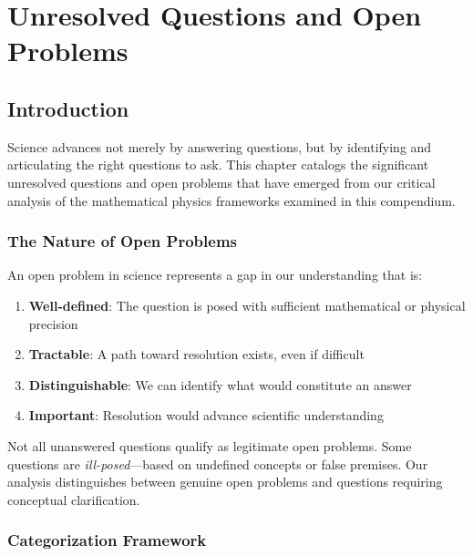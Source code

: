 
\chapter{Unresolved Questions and Open Problems}
\label{ch:unresolved}

\section{Introduction}

Science advances not merely by answering questions, but by identifying and articulating the right questions to ask. This chapter catalogs the significant unresolved questions and open problems that have emerged from our critical analysis of the mathematical physics frameworks examined in this compendium.

\subsection{The Nature of Open Problems}

An open problem in science represents a gap in our understanding that is:
\begin{enumerate}
    \item \textbf{Well-defined}: The question is posed with sufficient mathematical or physical precision
    \item \textbf{Tractable}: A path toward resolution exists, even if difficult
    \item \textbf{Distinguishable}: We can identify what would constitute an answer
    \item \textbf{Important}: Resolution would advance scientific understanding
\end{enumerate}

Not all unanswered questions qualify as legitimate open problems. Some questions are \textit{ill-posed}---based on undefined concepts or false premises. Our analysis distinguishes between genuine open problems and questions requiring conceptual clarification.

\subsection{Categorization Framework}

